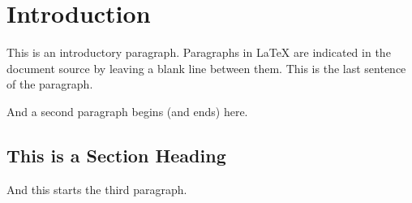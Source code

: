 \chapter{Introduction}

This is an introductory paragraph.  Paragraphs in \LaTeX{} are
indicated in the document source by leaving a blank line between
them.  This is the last sentence of the paragraph.

And a second paragraph begins (and ends) here.\cite{OpenCL}

\section{This is a Section Heading}

And this starts the third paragraph.
